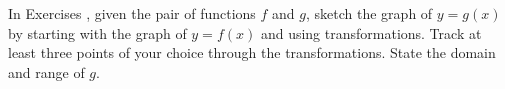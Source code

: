{\noindent In Exercises}
{, given the pair of functions $f$ and $g$, sketch the graph of $y=g(x)$ by starting with the graph of $y = f(x)$ and using transformations.  Track at least three points of your choice through the transformations. State the domain and range of $g$.}

